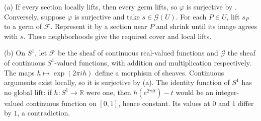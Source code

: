 (a) If every section locally lifts, then every germ lifts, so $\varphi$ is surjective by . Conversely, suppose $\varphi$ is surjective and take $s\in\mathscr G(U)$. For each $P\in U$, lift $s_P$ to a germ of $\mathscr F$. Represent it by a section near $P$ and shrink until its image agrees with $s$. These neighborhoods give the required cover and local lifts.

(b) On $S^1$, let $\mathscr F$ be the sheaf of continuous real-valued functions and $\mathscr G$ the sheaf of continuous $S^1$-valued functions, with addition and multiplication respectively. The maps $h\mapsto\exp(2\pi i h)$ define a morphism of sheaves. Continuous arguments exist locally, so it is surjective by (a). The identity function of $S^1$ has no global lift: if $h:S^1\to\mathbb R$ were one, then $h(e^{2\pi it})-t$ would be an integer-valued continuous function on $[0,1]$, hence constant. Its values at $0$ and $1$ differ by $1$, a contradiction.
